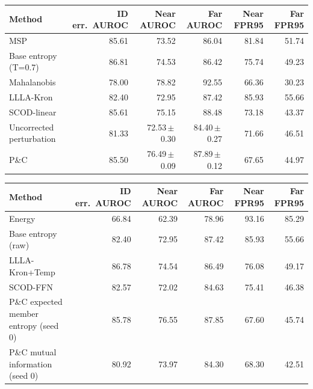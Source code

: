 \begin{tabular}{lrrrrr}
\toprule
Method & ID err.\ AUROC & Near AUROC & Far AUROC & Near FPR95 & Far FPR95 \\
\midrule
MSP & 85.61 & 73.52 & 86.04 & 81.84 & 51.74 \\
Base entropy (T=0.7) & 86.81 & 74.53 & 86.42 & 75.74 & 49.23 \\
Mahalanobis & 78.00 & 78.82 & 92.55 & 66.36 & 30.23 \\
LLLA-Kron & 82.40 & 72.95 & 87.42 & 85.93 & 55.66 \\
SCOD-linear & 85.61 & 75.15 & 88.48 & 73.18 & 43.37 \\
Uncorrected perturbation & 81.33 & 72.53\,$\pm$\,0.30 & 84.40\,$\pm$\,0.27 & 71.66 & 46.51 \\
P\&C & 85.50 & 76.49\,$\pm$\,0.09 & 87.89\,$\pm$\,0.12 & 67.65 & 44.97 \\
\bottomrule
\end{tabular}

\begin{tabular}{lrrrrr}
\toprule
Method & ID err.\ AUROC & Near AUROC & Far AUROC & Near FPR95 & Far FPR95 \\
\midrule
Energy & 66.84 & 62.39 & 78.96 & 93.16 & 85.29 \\
Base entropy (raw) & 82.40 & 72.95 & 87.42 & 85.93 & 55.66 \\
LLLA-Kron+Temp & 86.78 & 74.54 & 86.49 & 76.08 & 49.17 \\
SCOD-FFN & 82.57 & 72.02 & 84.63 & 75.41 & 46.38 \\
P\&C expected member entropy (seed 0) & 85.78 & 76.55 & 87.85 & 67.60 & 45.74 \\
P\&C mutual information (seed 0) & 80.92 & 73.97 & 84.30 & 68.30 & 42.51 \\
\bottomrule
\end{tabular}
